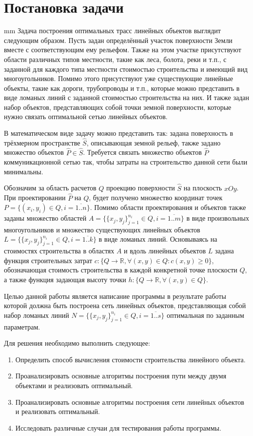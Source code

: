 \newpage
\section*{\LARGE{Постановка задачи}}
 mm
Задача построения оптимальных трасс линейных объектов выглядит следующим образом. Пусть задан определённый участок поверхности Земли вместе с соответствующим ему рельефом. Также на этом участке присутствуют области различных типов местности, такие как леса, болота, реки и т.п., с заданной для каждого типа местности стоимостью строительства и имеющий вид многоугольников. Помимо этого присутствуют уже существующие линейные объекты, такие как дороги, трубопроводы и т.п., которые можно представить в виде ломаных линий с заданной стоимостью строительства на них. И также задан набор объектов, представляющих собой точки земной поверхности, которые нужно связать оптимальной сетью линейных объектов.
\par
В математическом виде задачу можно представить так: задана поверхность в трёхмерном пространстве $\hat{S}$, описывающая земной рельеф, также задано множество объектов $\hat{P} \in \hat{S}$. Требуется связать множество объектов $\hat{P}$ коммуникационной сетью так, чтобы затраты на строительство данной сети были минимальны.
\par
Обозначим за область расчетов $Q$ проекцию поверхности $\hat{S}$ на плоскость $xOy$. 
При проектировании  $\hat{P}$ на $Q$, будет получено множество координат точек $P = \{(x_i, y_i) \in Q , i=\overline{1..n}\}$. Помимо области проектирования и объектов также заданы множество областей $A = \{\{x_{j},y_{j}\}_{j=1}^{n_i} \in Q, i=\overline{1..m}\}$ в виде произвольных многоугольников и множество существующих линейных объектов \mbox{$L = \{\{x_{j},y_{j}\}_{j=1}^{n_i} \in Q, i=\overline{1..k}\}$} в виде ломаных линий. 
Основываясь на стоимостях строительства в областях $A$ и вдоль линейных объектов $L$ задана функция строительных затрат $c: \{Q \rightarrow \mathbb{R}, \forall(x, y) \in Q: c(x, y) \ge 0\}$, обозначающая стоимость строительства в каждой конкретной точке плоскости $Q$, а также функция задающая высоту точки $h: \{Q \rightarrow \mathbb{R}, \forall(x, y) \in Q\}$.
\par
Целью данной работы является написание программы в результате работы которой должна быть построена сеть линейных объектов, представляющая собой набор ломаных линий $N = \{\{x_{j},y_{j}\}_{j=1}^{n_i} \in Q, i=\overline{1..s}\}$ оптимальная по заданным параметрам.
\par
Для решения необходимо выполнить следующее:
\begin{enumerate}
	\item Определить способ вычисления стоимости строительства линейного объекта.
	\item Проанализировать основные алгоритмы построения пути между двумя объектами и реализовать оптимальный.
	\item Проанализировать основные алгоритмы построения сети линейных объектов и реализовать оптимальный.
	\item Исследовать различные случаи для тестирования работы программы.
\end{enumerate}

